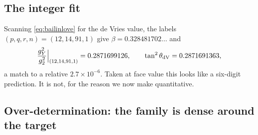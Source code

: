 \documentclass[11pt]{article}
\theoremstyle{plain}
\theoremstyle{definition}
\begin{document}
\subsection{The integer fit}

Scanning \eqref{eq:bailinlove} for the de Vries value, the labels
$(p,q,r,n)=(12,14,91,1)$ give $\beta=0.328481702\ldots$ and
\begin{equation}
\frac{g_Y^2}{g_2^2}\Big|_{(12,14,91,1)}=0.2871699126,
\qquad
\tan^2\theta_{\rm dV}=0.2871691363,
\end{equation}
a match to a relative $2.7\times10^{-6}$. Taken at face value this looks like
a six-digit prediction. It is not, for the reason we now make quantitative.

\subsection{Over-determination: the family is dense around the target}
\label{sec:overdet}
\end{document}
